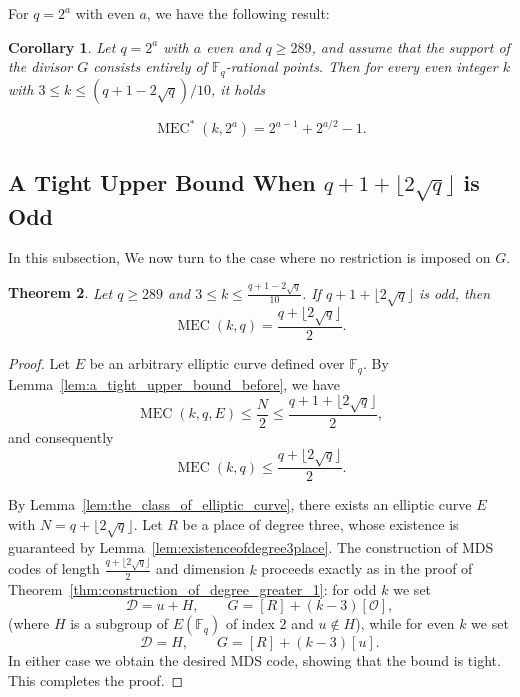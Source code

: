\documentclass[journal,12pt,onecolumn]{IEEEtran}
\newtheorem{theorem}{Theorem}
\newtheorem{corollary}[theorem]{Corollary}
\begin{document}
For $q = 2^a$ with even $a$, we have the following result:
\begin{corollary}\label{cor:q=2^a,evenkandG'}
Let $q = 2^a$ with $a$ even and $q \ge 289$, and assume that the support of the divisor $G$ consists entirely of $\mathbb{F}_q$-rational points. Then for every even integer $k$ with $3 \le k \le (q + 1 - 2\sqrt{q})/10$, it holds

\begin{equation}
    \operatorname{MEC}^*(k,2^a) =2^{a-1} + 2^{a/2} - 1 .
\end{equation}

\end{corollary}
\subsection{A Tight Upper Bound When $q+1+\lfloor 2\sqrt{q}\rfloor$ is Odd}
In this subsection, We now turn to the case where no restriction is imposed on $G$.
\begin{theorem}\label{thm:q+1+odd}
Let $q \ge 289$ and $3 \le k \le \frac{q+1-2\sqrt{q}}{10}$. If $q+1+ \lfloor 2\sqrt{q} \rfloor$ is odd, then
\[
\operatorname{MEC}(k,q) = \frac{q+ \lfloor 2\sqrt{q} \rfloor}{2}.
\]
\end{theorem}


\begin{proof}
Let $E$ be an arbitrary elliptic curve defined over $\mathbb{F}_q$. By Lemma~\ref{lem:a_tight_upper_bound_before}, we have
\[
\operatorname{MEC}(k,q,E) \le \frac{N}{2} \le \frac{q+1+ \lfloor 2\sqrt{q} \rfloor}{2},
\]
and consequently
\[
\operatorname{MEC}(k,q) \le \frac{q+ \lfloor 2\sqrt{q} \rfloor}{2}.
\]

By Lemma~\ref{lem:the_class_of_elliptic_curve}, there exists an elliptic curve $E$ with $N = q + \lfloor 2\sqrt{q} \rfloor$.  Let $R$ be a place of degree three, whose existence is guaranteed by Lemma~\ref{lem:existenceofdegree3place}.  The construction of MDS codes of length $\frac{q+ \lfloor 2\sqrt{q} \rfloor}{2}$ and dimension $k$ proceeds exactly as in the proof of Theorem~\ref{thm:construction_of_degree_greater_1}: for odd $k$ we set
\[
\mathcal{D} = u + H, \qquad G = [R] + (k-3)[\mathcal{O}],
\]
(where $H$ is a subgroup of $E(\mathbb{F}_q)$ of index $2$ and $u \notin H$), while for even $k$ we set
\[
\mathcal{D} = H, \qquad G = [R] + (k-3)[u].
\]
  In either case we obtain the desired MDS code, showing that the bound is tight.  This completes the proof.
\end{proof}
\end{document}
